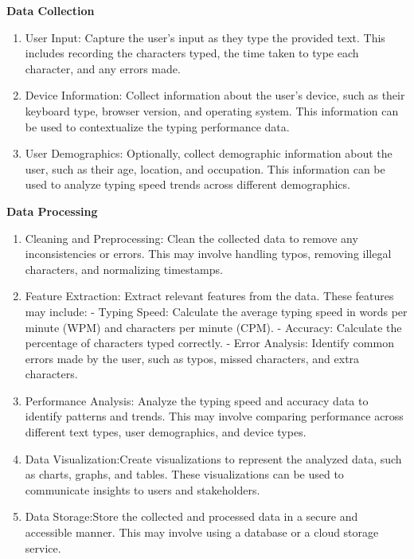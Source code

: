 \textbf{Data Collection}
\begin{enumerate}
    \item User Input: Capture the user's input as they type the provided text. This includes recording the characters typed, the time taken to type each character, and any errors made.

\item Device Information: Collect information about the user's device, such as their keyboard type, browser version, and operating system. This information can be used to contextualize the typing performance data.

\item User Demographics: Optionally, collect demographic information about the user, such as their age, location, and occupation. This information can be used to analyze typing speed trends across different demographics.
\end{enumerate}
\newpage

\textbf{Data Processing}

\begin{enumerate}
    \item Cleaning and Preprocessing: Clean the collected data to remove any inconsistencies or errors. This may involve handling typos, removing illegal characters, and normalizing timestamps.

\item  Feature Extraction: Extract relevant features from the data. These features may include:
   - Typing Speed: Calculate the average typing speed in words per minute (WPM) and characters per minute (CPM).
   - Accuracy: Calculate the percentage of characters typed correctly.
   - Error Analysis: Identify common errors made by the user, such as typos, missed characters, and extra characters.

\item  Performance Analysis: Analyze the typing speed and accuracy data to identify patterns and trends. This may involve comparing performance across different text types, user demographics, and device types.

\item  Data Visualization:Create visualizations to represent the analyzed data, such as charts, graphs, and tables. These visualizations can be used to communicate insights to users and stakeholders.

\item Data Storage:Store the collected and processed data in a secure and accessible manner. This may involve using a database or a cloud storage service.
\end{enumerate}
